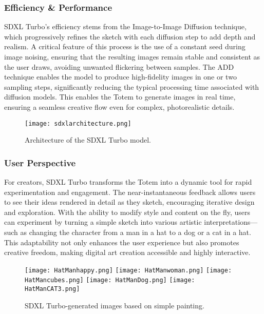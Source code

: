 \subsubsection{Efficiency & Performance}
SDXL Turbo’s efficiency stems from the Image-to-Image Diffusion technique, which progressively refines the sketch with each diffusion step to add depth and realism.
A critical feature of this process is the use of a constant seed during image noising, ensuring that the resulting images remain stable and consistent as the user draws, avoiding unwanted flickering between samples.
The ADD technique enables the model to produce high-fidelity images in one or two sampling steps, significantly reducing the typical processing time associated with diffusion models.
This enables the Totem to generate images in real time, ensuring a seamless creative flow even for complex, photorealistic details.

\begin{figure}[!h]
    \centering
    \texttt{[image: sdxlarchitecture.png]}
    \caption{Architecture of the SDXL Turbo model.}
    \vspace{0.1cm}
    \label{fig:sdxlarchitecture}
\end{figure}

\subsubsection{User Perspective}
For creators, SDXL Turbo transforms the Totem into a dynamic tool for rapid experimentation and engagement.
The near-instantaneous feedback allows users to see their ideas rendered in detail as they sketch, encouraging iterative design and exploration.
With the ability to modify style and content on the fly, users can experiment by turning a simple sketch into various artistic interpretations—such as changing the character from a man in a hat to a dog or a cat in a hat.
This adaptability not only enhances the user experience but also promotes creative freedom, making digital art creation accessible and highly interactive.

\begin{figure}[h!]
    \centering
    \texttt{[image: HatManhappy.png]}
    \texttt{[image: HatManwoman.png]}
    \texttt{[image: HatMancubes.png]}
    \texttt{[image: HatManDog.png]}
    \texttt{[image: HatManCAT3.png]}
    \caption{SDXL Turbo-generated images based on simple painting.}
    \vspace{0.1cm}
    \label{fig:sdxlpainting}
\end{figure}

